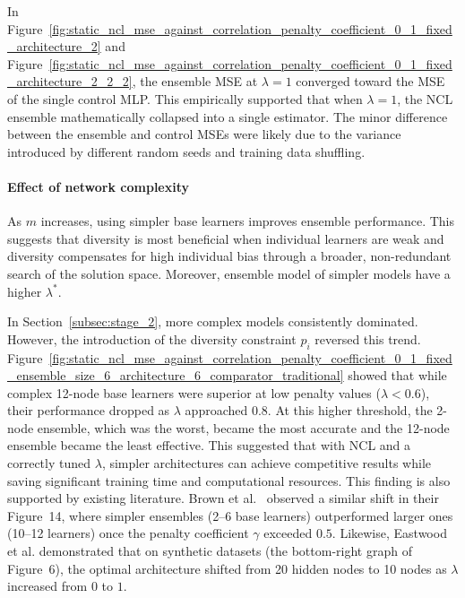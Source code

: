 In Figure~\ref{fig:static_ncl_mse_against_correlation_penalty_coefficient_0_1_fixed_architecture_2} and Figure~\ref{fig:static_ncl_mse_against_correlation_penalty_coefficient_0_1_fixed_architecture_2_2_2}, the ensemble MSE at $\lambda = 1$ converged toward the MSE of the single control MLP. This empirically supported that when $\lambda = 1$, the NCL ensemble mathematically collapsed into a single estimator. The minor difference between the ensemble and control MSEs were likely due to the variance introduced by different random seeds and training data shuffling. 

\paragraph{Effect of network complexity}
As $m$ increases, using simpler base learners improves ensemble performance. This suggests that diversity is most beneficial when individual learners are weak and diversity compensates for high individual bias through a broader, non-redundant search of the solution space. Moreover, ensemble model of simpler models have a higher $\lambda^*$. 

In Section~\ref{subsec:stage_2}, more complex models consistently dominated. However, the introduction of the diversity constraint $p_i$ reversed this trend. Figure~\ref{fig:static_ncl_mse_against_correlation_penalty_coefficient_0_1_fixed_ensemble_size_6_architecture_6_comparator_traditional} showed that while complex 12-node base learners were superior at low penalty values ($\lambda < 0.6$), their performance dropped as $\lambda$ approached $0.8$. At this higher threshold, the 2-node ensemble, which was the worst, became the most accurate and the 12-node ensemble became the least effective. This suggested that with NCL and a correctly tuned $\lambda$, simpler architectures can achieve competitive results while saving significant training time and computational resources. This finding is also supported by existing literature. Brown et al.\ \cite{brown2005managing} observed a similar shift in their Figure~14, where simpler ensembles (2--6 base learners) outperformed larger ones (10--12 learners) once the penalty coefficient $\gamma$ exceeded $0.5$. Likewise, Eastwood et al. \cite{eastwood2006lambda} demonstrated that on synthetic datasets (the bottom-right graph of Figure~6), the optimal architecture shifted from 20 hidden nodes to 10 nodes as $\lambda$ increased from $0$ to $1$. 

